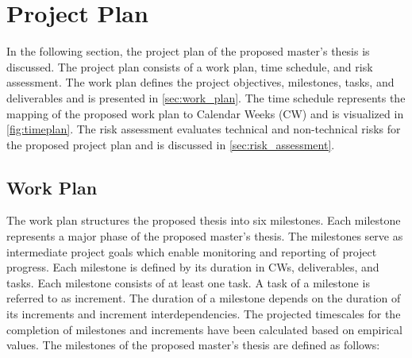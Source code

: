 \chapter{Project Plan}
\label{ch:project_plan}
In the following section, the project plan of the proposed master's thesis is discussed.
The project plan consists of a work plan, time schedule, and risk assessment.
The work plan defines the project objectives, milestones, tasks, and deliverables and is presented in \autoref{sec:work_plan}.
The time schedule represents the mapping of the proposed work plan to Calendar Weeks (CW) and is visualized in \autoref{fig:timeplan}.
The risk assessment evaluates technical and non-technical risks for the proposed project plan and is discussed in \autoref{sec:risk_assessment}.

\section{Work Plan}
\label{sec:work_plan}
The work plan structures the proposed thesis into six milestones.
Each milestone represents a major phase of the proposed master's thesis.
The milestones serve as intermediate project goals which enable monitoring and reporting of project progress.
Each milestone is defined by its duration in CWs, deliverables, and tasks.
Each milestone consists of at least one task.
A task of a milestone is referred to as increment.
The duration of a milestone depends on the duration of its increments and increment interdependencies.
The projected timescales for the completion of milestones and increments have been calculated based on empirical values.
The milestones of the proposed master's thesis are defined as follows:
